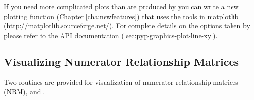 If you need more complicated plots than are produced by  you can write a new plotting function (Chapter \ref{cha:newfeatures}) that uses the tools in matplotlib (\url{http://matplotlib.sourceforge.net/}). For complete details on the options taken by  please refer to the API documentation (\ref{sec:pyp-graphics-plot-line-xy}).
\subsection{Visualizing Numerator Relationship Matrices}
\label{sec:graphics-visualizing-nrm}
Two routines are provided for visualization of numerator relationship matrices (NRM),  and .

